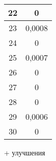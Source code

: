 \begin{table}[ht!]
\begin{tabular}{|c|c|}
		22      & 0                                      \\ \hline
		23      & 0,0008                                 \\ \hline
		24      & 0                                      \\ \hline
		25      & 0,0007                                 \\ \hline
		26      & 0                                      \\ \hline
		27      & 0                                      \\ \hline
		28      & 0                                      \\ \hline
		29      & 0,0006                                 \\ \hline
		30      & 0                                      \\ \hline
	\end{tabular}
\end{table}
\FloatBarrier
+ улучшения
